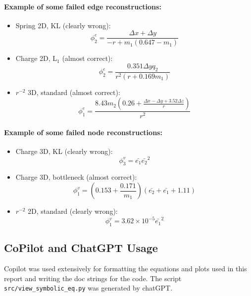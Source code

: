 \documentclass[11pt]{article}
\begin{document}
\paragraph*{Example of some failed edge reconstructions:}
\begin{itemize}
    \item

    Spring 2D, KL (clearly wrong):
    $$
    \phi^{e}_2 = \frac{\Delta x + \Delta y}{-r + m_1 ( 0.647 - m_1)}
    $$
    \item
    Charge 2D, L$_1$ (almost correct):
    $$
    \phi^{e}_2 = \frac{0.351\Delta y q_2}{r^2(r+0.169m_1)}
    $$
    \item
    $r^{-2}$ 3D, standard (almost correct):
    $$
    \phi^{e}_1 = \frac{8.43m_2(0.26+\frac{\Delta x - \Delta y + 3.52\Delta z}{r})}{r^2}
    $$
\end{itemize}
\paragraph{Example of some failed node reconstructions:}
\begin{itemize}
    \item
    Charge 3D, KL (clearly wrong):
    $$
    \phi^{v}_3 = \bar{e_1}\bar{e_2}^2
    $$
    \item
    Charge 3D, bottleneck (almost correct):
    $$
    \phi^{v}_1 = (0.153 + \frac{0.171}{m_1})(\bar{e_2} + \bar{e_1} + 1.11)
    $$
    \item
    $r^{-2}$ 2D, standard (clearly wrong):
    $$
    \phi^{v}_1 = 3.62 \times 10^{-5} \bar{e_1}^2
    $$
\end{itemize}

\subsection{CoPilot and ChatGPT Usage}
Copilot was used extensively for formatting the equations and plots used in this report and writing the doc strings for the code. The script \texttt{src/view\_symbolic\_eq.py} was generated by chatGPT.






\end{document}
